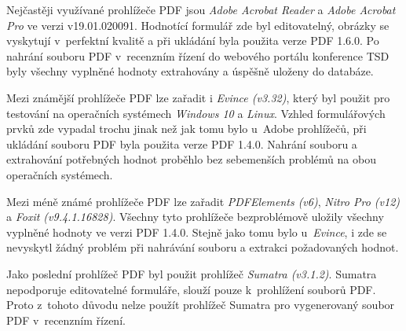 \par
Nejčastěji využívané prohlížeče PDF jsou \textit{Adobe Acrobat Reader} a \textit{Adobe Acrobat Pro} ve verzi v19.01.020091. Hodnotící formulář zde byl editovatelný, obrázky se vyskytují v~perfektní kvalitě a při ukládání byla použita verze PDF 1.6.0. Po nahrání souboru PDF v~recenzním řízení do webového portálu konference TSD byly všechny vyplněné hodnoty extrahovány a úspěšně uloženy do databáze.
\par
Mezi známější prohlížeče PDF lze zařadit i \textit{Evince (v3.32)}, který byl použit pro testování na operačních systémech \textit{Windows 10} a \textit{Linux}. Vzhled formulářových prvků zde vypadal trochu jinak než jak tomu bylo u~Adobe prohlížečů, při ukládání souboru PDF byla použita verze PDF 1.4.0. Nahrání souboru a extrahování potřebných hodnot proběhlo bez sebemenších problémů na obou operačních systémech.
\par
Mezi méně známé prohlížeče PDF lze zařadit \textit{PDFElements (v6)}, \textit{Nitro Pro (v12)} a \textit{Foxit (v9.4.1.16828)}. Všechny tyto prohlížeče bezproblémově uložily všechny vyplněné hodnoty ve verzi PDF 1.4.0. Stejně jako tomu bylo u~\textit{Evince}, i zde se nevyskytl žádný problém při nahrávání souboru a extrakci požadovaných hodnot.
\par
Jako poslední prohlížeč PDF byl použit prohlížeč \textit{Sumatra (v3.1.2)}. Sumatra nepodporuje editovatelné formuláře, slouží pouze k~prohlížení souborů PDF. Proto z~tohoto důvodu nelze použít prohlížeč Sumatra pro vygenerovaný soubor PDF v~recenzním řízení.


